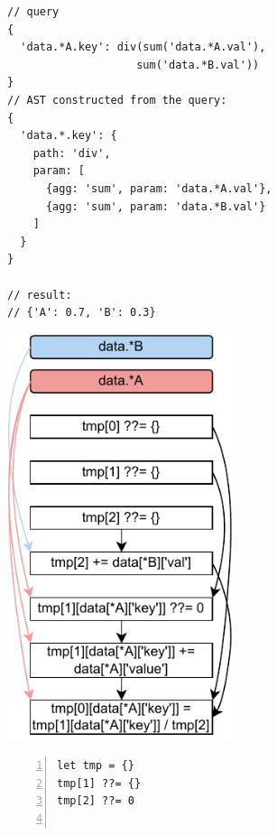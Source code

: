 \documentclass[runningheads]{llncs}
\begin{document}
\begin{figure}[t!]
\begin{subfigure}{\textwidth}
\begin{minipage}{0.33\textwidth}
\begin{lstlisting}[style=JavaScriptTiny, columns=flexible]
// query
{
  'data.*A.key': div(sum('data.*A.val'), 
                    sum('data.*B.val')) 
}
// AST constructed from the query:
{
  'data.*.key': {
    path: 'div',
    param: [
      {agg: 'sum', param: 'data.*A.val'},
      {agg: 'sum', param: 'data.*B.val'}
    ]
  }
}

// result:
// {'A': 0.7, 'B': 0.3}
\end{lstlisting}
\end{minipage}
\begin{minipage}{0.27\textwidth}
\hspace{1mm}
\includegraphics[width=0.73\textwidth]{images/intro_q3_ir.pdf}
\end{minipage}
\begin{minipage}{0.38\textwidth}
\begin{lstlisting}[style=JavaScriptTiny, columns=flexible, numbers=left, xleftmargin=2pt]
let tmp = {}
tmp[1] ??= {}
tmp[2] ??= 0


\end{lstlisting}
\end{minipage}
\end{subfigure}
\end{figure}
\end{document}
